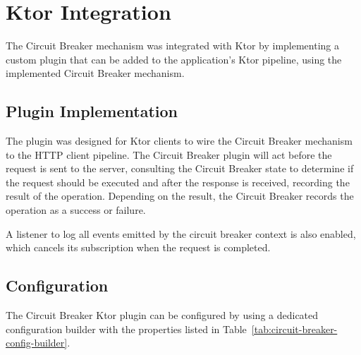 \resilienceMechanismDefaultConfig


\section{Ktor Integration}\label{sec:cbreaker-ktor-integration}

The Circuit Breaker mechanism was integrated with Ktor by implementing a custom plugin that can be added to the application's Ktor pipeline, using the implemented Circuit Breaker mechanism.

\subsection{Plugin Implementation}\label{subsec:cbreaker-plugin}

The plugin was designed for Ktor clients to wire the Circuit Breaker mechanism to the HTTP client pipeline.
The Circuit Breaker plugin will act before the request is sent to the server,
consulting the Circuit Breaker state to determine if the request should be executed and after the response is received,
recording the result of the operation.
Depending on the result, the Circuit Breaker records the operation as a success or failure.

A listener to log all events emitted by the circuit breaker context is also enabled, which cancels its subscription
when the request is completed.

\subsection{Configuration}\label{subsec:cbreaker-configuration}

The Circuit Breaker Ktor plugin can be configured
by using a dedicated configuration builder with the properties listed in Table~\ref{tab:circuit-breaker-config-builder}.

